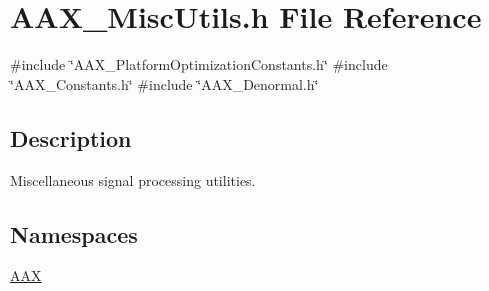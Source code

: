 \hypertarget{a00770}{}\section{A\+A\+X\+\_\+\+Misc\+Utils.\+h File Reference}
\label{a00770}
{\ttfamily \#include \char`\"{}A\+A\+X\+\_\+\+Platform\+Optimization\+Constants.\+h\char`\"{}}\newline
{\ttfamily \#include \char`\"{}A\+A\+X\+\_\+\+Constants.\+h\char`\"{}}\newline
{\ttfamily \#include \char`\"{}A\+A\+X\+\_\+\+Denormal.\+h\char`\"{}}\newline


\subsection{Description}
Miscellaneous signal processing utilities. 

\subsection*{Namespaces}
\begin{DoxyCompactItemize}
\item 
 \mbox{\hyperlink{a00852}{A\+AX}}
\end{DoxyCompactItemize}
